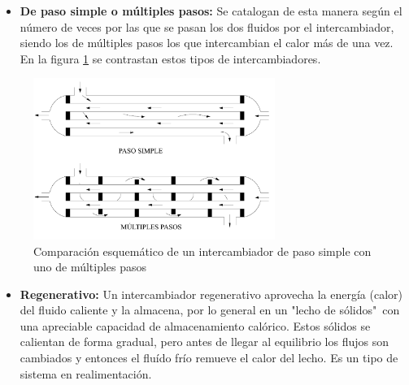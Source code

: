 \documentclass[12pt,letterpaper]{article}     %
\begin{document}
  
  


\begin{itemize}
\item \textbf{De paso simple o múltiples pasos:} Se catalogan de esta manera según el número de veces por las que se pasan los dos fluidos por el intercambiador, siendo los de múltiples pasos los que intercambian el calor más de una vez. En la figura \ref{fig:pasos} se contrastan estos tipos de intercambiadores.
\end{itemize}

\begin{figure}[H]
\centering
\includegraphics[width=0.7\textwidth]{pasos.png}
\caption{Comparación esquemático de un intercambiador de paso simple con uno de múltiples pasos \cite{Jaramillo}}
\label{fig:pasos}
\end{figure}

\begin{itemize}
\item \textbf{Regenerativo:} Un intercambiador regenerativo aprovecha la energía (calor) del fluido caliente y la almacena, por lo general en un "lecho de sólidos"\ con una apreciable capacidad de almacenamiento calórico. Estos sólidos se calientan de forma gradual, pero antes de llegar al equilibrio los flujos son cambiados y entonces el fluído frío remueve el calor del lecho. Es un tipo de sistema en realimentación. 
\end{itemize}
\end{document}
